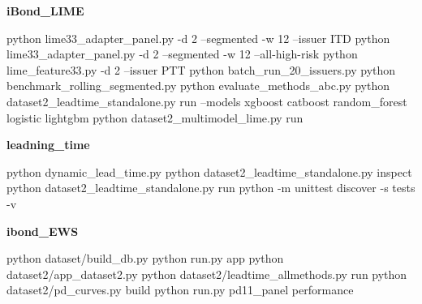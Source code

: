 \documentclass[12pt]{article}
\begin{document}
\textbf{iBond\_LIME}
\begin{CmdS}
python lime33_adapter_panel.py -d 2 --segmented -w 12 --issuer ITD
python lime33_adapter_panel.py -d 2 --segmented -w 12 --all-high-risk
python lime_feature33.py -d 2 --issuer PTT
python batch_run_20_issuers.py
python benchmark_rolling_segmented.py
python evaluate_methods_abc.py
python dataset2_leadtime_standalone.py run --models xgboost catboost random_forest logistic lightgbm
python dataset2_multimodel_lime.py run
\end{CmdS}

\textbf{leadning\_time}
\begin{Cmd}
python dynamic_lead_time.py
python dataset2_leadtime_standalone.py inspect
python dataset2_leadtime_standalone.py run
python -m unittest discover -s tests -v
\end{Cmd}

\textbf{ibond\_EWS}
\begin{Cmd}
python dataset/build_db.py
python run.py app
python dataset2/app_dataset2.py
python dataset2/leadtime_allmethods.py run
python dataset2/pd_curves.py build
python run.py pd11_panel performance
\end{Cmd}
\end{document}
